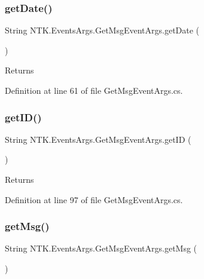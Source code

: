 \subsubsection{\texorpdfstring{getDate()}{getDate()}}
{\footnotesize\ttfamily String N\+T\+K.\+Events\+Args.\+Get\+Msg\+Event\+Args.\+get\+Date (\begin{DoxyParamCaption}{ }\end{DoxyParamCaption})}





\begin{DoxyReturn}{Returns}

\end{DoxyReturn}


Definition at line 61 of file Get\+Msg\+Event\+Args.\+cs.

\mbox{\label{class_n_t_k_1_1_events_args_1_1_get_msg_event_args_acca9af0bd878f3da5e6044baa8a11266}} 
\subsubsection{\texorpdfstring{getID()}{getID()}}
{\footnotesize\ttfamily String N\+T\+K.\+Events\+Args.\+Get\+Msg\+Event\+Args.\+get\+ID (\begin{DoxyParamCaption}{ }\end{DoxyParamCaption})}





\begin{DoxyReturn}{Returns}

\end{DoxyReturn}


Definition at line 97 of file Get\+Msg\+Event\+Args.\+cs.

\mbox{\label{class_n_t_k_1_1_events_args_1_1_get_msg_event_args_ac933c655f86889a0f238ca5054166091}} 
\subsubsection{\texorpdfstring{getMsg()}{getMsg()}}
{\footnotesize\ttfamily String N\+T\+K.\+Events\+Args.\+Get\+Msg\+Event\+Args.\+get\+Msg (\begin{DoxyParamCaption}{ }\end{DoxyParamCaption})}





